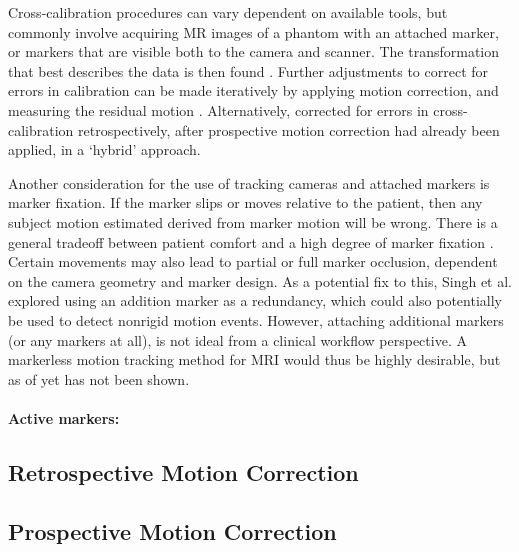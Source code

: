 \documentclass[class=article, crop=false]{standalone}
\begin{document}
\par 
Cross-calibration procedures can vary dependent on available tools, but commonly involve acquiring MR images of a phantom with an attached marker, or markers that are visible both to the camera and scanner. The transformation that best describes the data is then found \parencite{Zahneisen2014,Aksoy2011,Zaitsev2006a}. Further adjustments to correct for errors in calibration can be made iteratively by applying motion correction, and measuring the residual motion \parencite{Zaitsev2006a,Zahneisen2014}. Alternatively, \cite{Aksoy2012} corrected for errors in cross-calibration retrospectively, after prospective motion correction had already been applied, in a `hybrid' approach.
\par
Another consideration for the use of tracking cameras and attached markers is marker fixation. If the marker slips or moves relative to the patient, then any subject motion estimated derived from marker motion will be wrong. There is a general tradeoff between patient comfort and a high degree of marker fixation \parencite{Maclaren2013}. Certain movements may also lead to partial or full marker occlusion, dependent on the camera geometry and marker design. As a potential fix to this, Singh et al. \parencite*{Singh2015} explored using an addition marker as a redundancy, which could also potentially be used to detect nonrigid motion events. However, attaching additional markers (or any markers at all), is not ideal from a clinical workflow perspective. A markerless motion tracking method for MRI would thus be highly desirable, but as of yet has not been shown.

\paragraph{Active markers:}

\subsection{Retrospective Motion Correction}

\subsection{Prospective Motion Correction}
\end{document}
